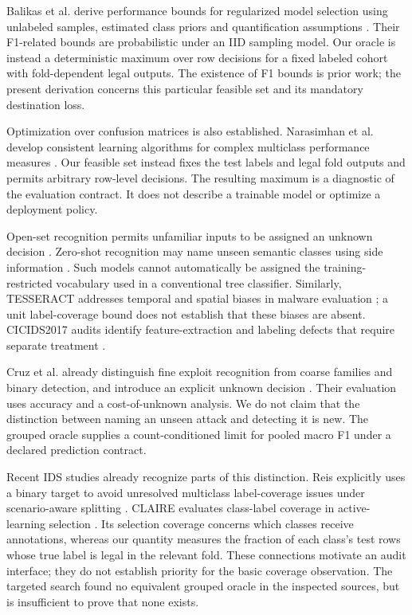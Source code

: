 \documentclass[twocolumn]{svjour3}
\begin{document}
Balikas et al. derive performance bounds for regularized model selection using unlabeled samples, estimated class priors and quantification assumptions \cite{balikas2015}. Their F1-related bounds are probabilistic under an IID sampling model. Our oracle is instead a deterministic maximum over row decisions for a fixed labeled cohort with fold-dependent legal outputs. The existence of F1 bounds is prior work; the present derivation concerns this particular feasible set and its mandatory destination loss.

Optimization over confusion matrices is also established. Narasimhan et al. develop consistent learning algorithms for complex multiclass performance measures \cite{narasimhan2015}. Our feasible set instead fixes the test labels and legal fold outputs and permits arbitrary row-level decisions. The resulting maximum is a diagnostic of the evaluation contract. It does not describe a trainable model or optimize a deployment policy.

Open-set recognition permits unfamiliar inputs to be assigned an unknown decision \cite{scheirer2013}. Zero-shot recognition may name unseen semantic classes using side information \cite{xian2017}. Such models cannot automatically be assigned the training-restricted vocabulary used in a conventional tree classifier. Similarly, TESSERACT addresses temporal and spatial biases in malware evaluation \cite{pendlebury2019}; a unit label-coverage bound does not establish that these biases are absent. CICIDS2017 audits identify feature-extraction and labeling defects that require separate treatment \cite{engelen2021} \cite{lanvin2023}.

Cruz et al. already distinguish fine exploit recognition from coarse families and binary detection, and introduce an explicit unknown decision \cite{cruz2017}. Their evaluation uses accuracy and a cost-of-unknown analysis. We do not claim that the distinction between naming an unseen attack and detecting it is new. The grouped oracle supplies a count-conditioned limit for pooled macro F1 under a declared prediction contract.

Recent IDS studies already recognize parts of this distinction. Reis explicitly uses a binary target to avoid unresolved multiclass label-coverage issues under scenario-aware splitting \cite{reis2026}. CLAIRE evaluates class-label coverage in active-learning selection \cite{almalawi2025}. Its selection coverage concerns which classes receive annotations, whereas our quantity measures the fraction of each class's test rows whose true label is legal in the relevant fold. These connections motivate an audit interface; they do not establish priority for the basic coverage observation. The targeted search found no equivalent grouped oracle in the inspected sources, but is insufficient to prove that none exists.
\end{document}
